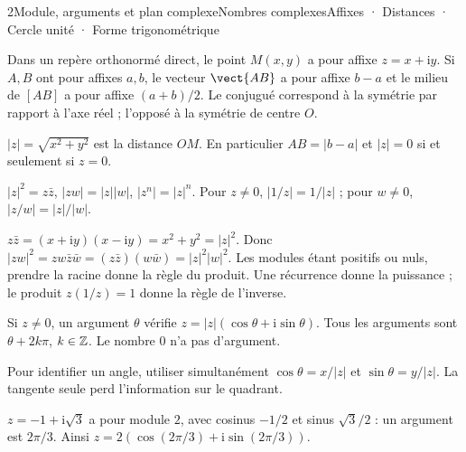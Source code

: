 \begin{ouverture}[trigo]{2}{Module, arguments et plan complexe}{Nombres complexes}{Affixes · Distances · Cercle unité · Forme trigonométrique}
\end{ouverture}
\essentiel

Dans un repère orthonormé direct, le point $M(x,y)$ a pour affixe $z=x+\mathrm iy$.
Si $A,B$ ont pour affixes $a,b$, le vecteur $\vect{AB}$ a pour affixe $b-a$ et le milieu de $[AB]$ a pour affixe $(a+b)/2$.
Le conjugué correspond à la symétrie par rapport à l'axe réel ; l'opposé à la symétrie de centre $O$.
\begin{definition}[Module]
$|z|=\sqrt{x^2+y^2}$ est la distance $OM$.
En particulier $AB=|b-a|$ et $|z|=0$ si et seulement si $z=0$.
\end{definition}
\begin{propriete}
$|z|^2=z\bar z$, $|zw|=|z||w|$, $|z^n|=|z|^n$.
Pour $z\ne0$, $|1/z|=1/|z|$ ; pour $w\ne0$, $|z/w|=|z|/|w|$.
\end{propriete}
\begin{demonstration}
$z\bar z=(x+\mathrm iy)(x-\mathrm iy)=x^2+y^2=|z|^2$.
Donc $|zw|^2=zw\bar z\bar w=(z\bar z)(w\bar w)=|z|^2|w|^2$. Les modules étant positifs ou nuls, prendre la racine donne la règle du produit.
Une récurrence donne la puissance ; le produit $z(1/z)=1$ donne la règle de l'inverse.
\end{demonstration}
\begin{definition}
Si $z\ne0$, un argument $\theta$ vérifie $z=|z|(\cos\theta+\mathrm i\sin\theta)$.
Tous les arguments sont $\theta+2k\pi$, $k\in\mathbb{Z}$.
Le nombre $0$ n'a pas d'argument.
\end{definition}
Pour identifier un angle, utiliser simultanément $\cos\theta=x/|z|$ et $\sin\theta=y/|z|$. La tangente seule perd l'information sur le quadrant.
\begin{exemple}
$z=-1+\mathrm i\sqrt3$ a pour module $2$, avec cosinus $-1/2$ et sinus $\sqrt3/2$ : un argument est $2\pi/3$.
Ainsi $z=2(\cos(2\pi/3)+\mathrm i\sin(2\pi/3))$.
\end{exemple}
